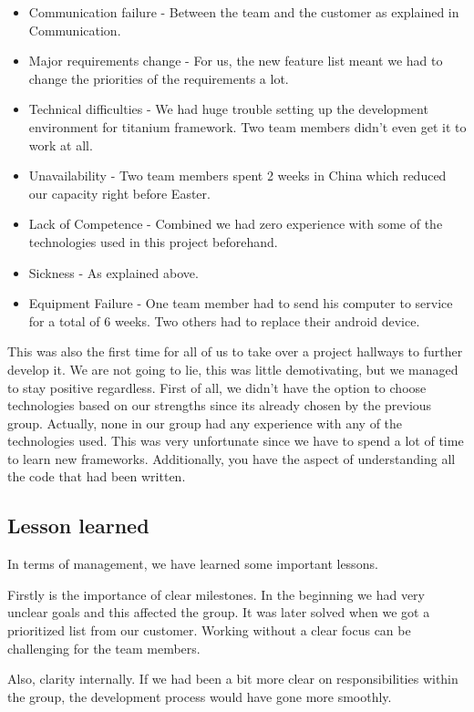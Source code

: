 \begin{itemize}
	\item Communication failure - Between the team and the customer as explained in Communication.
	\item Major requirements change - For us, the new feature list meant we had to change the priorities of the requirements a lot.
	\item Technical difficulties - We had huge trouble setting up the development environment for titanium framework. Two team members didn't even get it to work at all.
	\item Unavailability - Two team members spent 2 weeks in China which reduced our capacity right before Easter. 
	\item Lack of Competence - Combined we had zero experience with some of the technologies used in this project beforehand.
	\item Sickness - As explained above.
	\item Equipment Failure - One team member had to send his computer to service for a total of 6 weeks. Two others had to replace their android device. 
\end{itemize}

This was also the first time for all of us to take over a project hallways to further develop it. We are not going to lie, this was little demotivating, but we managed to stay positive regardless. First of all, we didn't have the option to choose technologies based on our strengths since its already chosen by the previous group. Actually, none in our group had any experience with any of the technologies used. This was very unfortunate since we have to spend a lot of time to learn new frameworks. Additionally, you have the aspect of understanding all the code that had been written. 

	\subsection{Lesson learned}

In terms of management, we have learned some important lessons.

Firstly is the importance of clear milestones. In the beginning we had very unclear goals and this affected the group. It was later solved when we got a prioritized list from our customer. Working without a clear focus can be challenging for the team members.

Also, clarity internally. If we had been a bit more clear on responsibilities within the group, the development process would have gone more smoothly.

